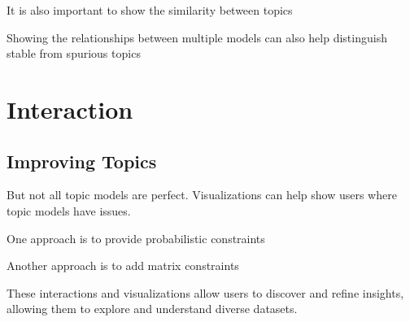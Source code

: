 It is also important to show the similarity between
topics~\citep{chuang-12}

Showing the relationships between multiple models can also help
distinguish stable from spurious topics~\citep{chuang-15}

\section{Interaction}

\subsection{Improving Topics}

But not all topic models are perfect.  Visualizations can help show
users where topic models have issues.

One approach is to provide probabilistic constraints~\citep{hu-14:itm}

Another approach is to add matrix constraints~\citep{choo-13}

These interactions and visualizations allow users to discover and
refine insights, allowing them to explore and understand diverse
datasets.
